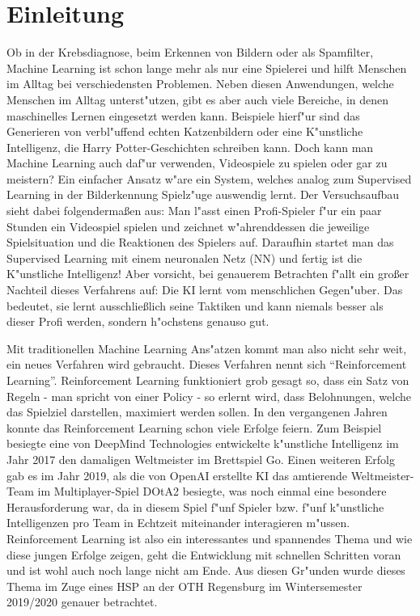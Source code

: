 \documentclass[12pt,a4paper]{article}
\begin{document}
\section{Einleitung}
Ob in der Krebsdiagnose, beim Erkennen von Bildern oder als Spamfilter, Machine Learning ist schon lange mehr als nur eine Spielerei und hilft Menschen im Alltag bei verschiedensten Problemen.
Neben diesen Anwendungen, welche Menschen im Alltag unterst"utzen, gibt es aber auch viele Bereiche, in denen maschinelles Lernen eingesetzt werden kann.
Beispiele hierf"ur sind das Generieren von verbl"uffend echten Katzenbildern\cite{thiscat:cat} oder eine K"unstliche Intelligenz, die Harry Potter-Geschichten schreiben kann\cite{mediium:potter}.\newline
Doch kann man Machine Learning auch daf"ur verwenden, Videospiele zu spielen oder gar zu meistern?
Ein einfacher Ansatz w"are ein System, welches analog zum Supervised Learning in der Bilderkennung Spielz"uge auswendig lernt.
Der Versuchsaufbau sieht dabei folgendermaßen aus: Man l"asst einen Profi-Spieler f"ur ein paar Stunden ein Videospiel spielen und zeichnet w"ahrenddessen die jeweilige Spielsituation und die Reaktionen des Spielers auf.
Daraufhin startet man das Supervised Learning mit einem neuronalen Netz (NN) und fertig ist die K"unstliche Intelligenz!
Aber vorsicht, bei genauerem Betrachten f"allt ein großer Nachteil dieses Verfahrens auf: Die KI lernt vom menschlichen Gegen"uber.
Das bedeutet, sie lernt ausschließlich seine Taktiken und kann niemals besser als dieser Profi werden, sondern h"ochstens genauso gut.

Mit traditionellen Machine Learning Ans"atzen kommt man also nicht sehr weit, ein neues Verfahren wird gebraucht. Dieses Verfahren nennt sich ``Reinforcement Learning''.
Reinforcement Learning funktioniert grob gesagt so, dass ein Satz von Regeln - man spricht von einer Policy - so erlernt wird, dass Belohnungen, welche das Spielziel darstellen, maximiert werden sollen.\newline
In den vergangenen Jahren konnte das Reinforcement Learning schon viele Erfolge feiern. Zum Beispiel besiegte eine von DeepMind Technologies\cite{deepmind:go} entwickelte k"unstliche Intelligenz im Jahr 2017 den damaligen Weltmeister im Brettspiel Go\cite{nytimes:alphago}.
Einen weiteren Erfolg gab es im Jahr 2019, als die von OpenAI\cite{openai:website} erstellte KI das amtierende Weltmeister-Team im Multiplayer-Spiel DOtA2 besiegte, was noch einmal eine besondere Herausforderung war, da in diesem Spiel f"unf Spieler bzw. f"unf k"unstliche Intelligenzen pro Team in Echtzeit miteinander interagieren m"ussen\cite{openai:five}.\newline
Reinforcement Learning ist also ein interessantes und spannendes Thema und wie diese jungen Erfolge zeigen, geht die Entwicklung mit schnellen Schritten voran und ist wohl auch noch lange nicht am Ende.
Aus diesen Gr"unden wurde dieses Thema im Zuge eines HSP an der OTH Regensburg im Wintersemester 2019/2020 genauer betrachtet.
\end{document}
